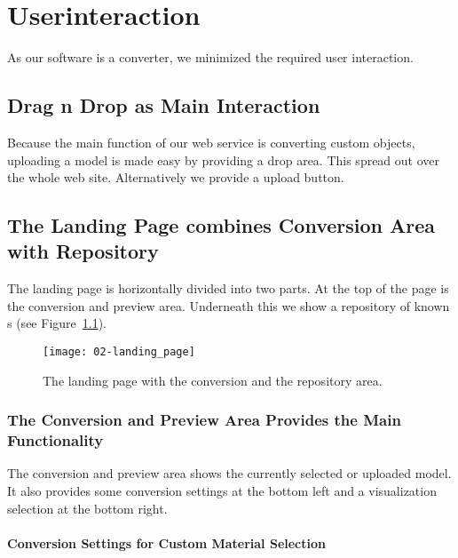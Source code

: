 \documentclass[../ClassicThesis.tex]{subfiles}
\begin{document}
\chapter{Userinteraction}\label{ch:userinteraction}


As our software is a converter, we minimized the required user interaction.

\section{Drag n Drop as Main Interaction}

Because the main function of our web service is converting custom objects, uploading a model is made easy by providing a drop area. This spread out over the whole web site. Alternatively we provide a upload button.

\section{The Landing Page combines Conversion Area with Repository}

The landing page is horizontally divided into two parts. At the top of the page is the conversion and preview area. Underneath this we show a repository of known \threedmodel s (see Figure~\ref{fig:landing_page}).

\begin{figure}
  \centering
  \texttt{[image: 02-landing\_page]}
  \caption{The landing page with the conversion and the repository area.}
  \label{fig:landing_page}
\end{figure}

\subsection{The Conversion and Preview Area Provides the Main Functionality}

The conversion and preview area shows the currently selected or uploaded model. It also provides some conversion settings at the bottom left and a visualization selection at the bottom right.

\subsubsection{Conversion Settings for Custom Material Selection}
\end{document}
